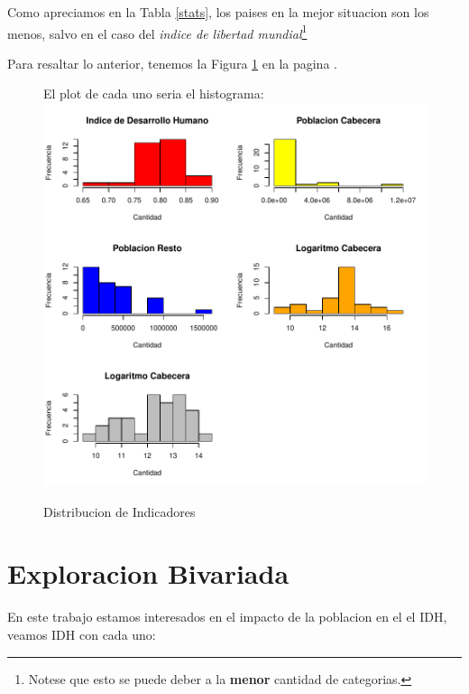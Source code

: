 \documentclass{article}
\begin{document}
Como apreciamos en la Tabla \ref{stats}, los paises en la mejor situacion son los menos, salvo en el caso del \emph{indice de libertad mundial}\footnote{Notese que esto se puede deber a la {\bf menor} cantidad de categorias.}

\clearpage

Para resaltar lo anterior, tenemos la Figura \ref{pintarHistogramas} en la pagina \pageref{pintarHistogramas}. 

\begin{figure}[h]
\centering

El plot de cada uno seria el histograma:
\includegraphics{ProyectoFinal-pintarHistogramas}
\caption{Distribucion de Indicadores}
\label{pintarHistogramas}
\end{figure}

\clearpage


\section{Exploracion Bivariada}\label{Bivariada}

En este trabajo estamos interesados en el impacto de la poblacion en el el IDH, veamos IDH con cada uno:
\end{document}
